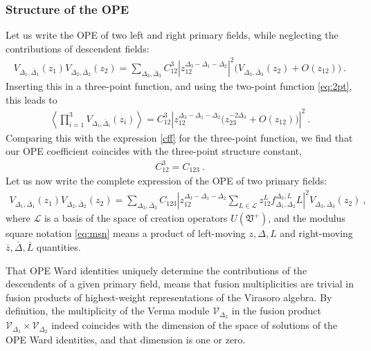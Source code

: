 \documentclass[12pt, a4paper, notitlepage, twoside]{report}
\numberwithin{equation}{section}
\theoremstyle{break}
\begin{document}
\subsubsection{Structure of the OPE}

Let us write the OPE of two left and right primary fields, while neglecting the contributions of descendent fields:
\begin{align}
 V_{\Delta_1,\bar\Delta_1}(z_1) V_{\Delta_2,\bar\Delta_2}(z_2) 
 = 
 \sum_{\Delta_3,\bar\Delta_3} C^{3}_{12}
 \left| z_{12}^{\Delta_3-\Delta_1-\Delta_2}\right|^2 \Big( V_{\Delta_3,\bar\Delta_3}(z_2) + O(z_{12})\Big)\ .
\end{align}
Inserting this in a three-point function, and using the two-point function \eqref{eq:2pt}, this leads to
\begin{align}
 \left<  \prod_{i=1}^3 V_{\Delta_i,\bar\Delta_i}(z_i) \right> 
 = 
 C^3_{12} \left| z_{12}^{\Delta_3-\Delta_1-\Delta_2} \Big( z_{23}^{-2\Delta_3} + O(z_{12}) \Big) \right|^2\ .
\end{align}
Comparing this with the expression \eqref{cff} for the three-point function, we find that our OPE coefficient coincides with the three-point structure constant, 
\begin{align}
 C^3_{12}= C_{123}\ .
 \label{cftt}
\end{align}
Let us now write the complete expression of the OPE of two primary fields:
\begin{align}
 \boxed{ V_{\Delta_1,\bar\Delta_1}(z_1) V_{\Delta_2,\bar\Delta_2}(z_2) 
 = 
 \sum_{\Delta_3,\bar\Delta_3} C_{123} \left| z_{12}^{\Delta_3-\Delta_1-\Delta_2}\sum_{L\in\mathcal{L}} z_{12}^Lf^{\Delta_3,L}_{\Delta_1,\Delta_2} L \right|^2 V_{\Delta_3,\bar\Delta_3}(z_2)
 }\ ,
 \label{vvs}
\end{align}
where $\mathcal{L}$ is a basis of the space of creation operators $U(\mathfrak{V}^+)$, and the modulus square notation \eqref{eq:msn} means a product of left-moving $z,\Delta,L$ and right-moving $\bar z, \bar \Delta, \bar L$ quantities.

That OPE Ward identities uniquely determine the contributions of the descendents of a given primary field, means that fusion multiplicities are trivial in fusion products of highest-weight representations of the Virasoro algebra. By definition, the multiplicity of the Verma module $\mathcal{V}_{\Delta_3}$ in the fusion product $\mathcal{V}_{\Delta_1}\times \mathcal{V}_{\Delta_2}$ indeed coincides with the dimension of the space of solutions of the OPE Ward identities, and that dimension is one or zero.
\end{document}
